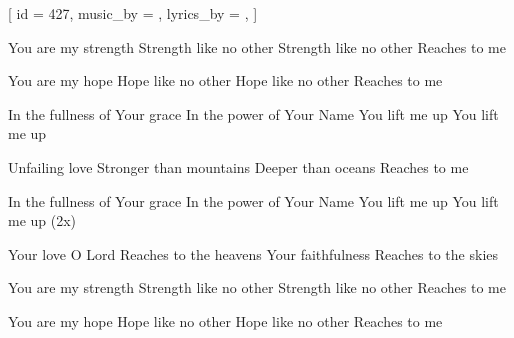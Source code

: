
[
    id                  = {427},
    music_by            = {},
    lyrics_by           = {},
]


\beginverse

You are my strength
Strength like no other
Strength like no other
Reaches to me

\endverse


\beginverse

You are my hope
Hope like no other
Hope like no other
Reaches to me

\endverse


\beginverse

In the fullness of Your grace
In the power of Your Name
You lift me up
You lift me up

\endverse



\beginverse

Unfailing love
Stronger than mountains
Deeper than oceans
Reaches to me

\endverse


\beginverse

In the fullness of Your grace
In the power of Your Name
You lift me up
You lift me up (2x)

\endverse



\beginverse

Your love O Lord
Reaches to the heavens
Your faithfulness
Reaches to the skies

\endverse


\beginverse

You are my strength
Strength like no other
Strength like no other
Reaches to me

\endverse


\beginverse

You are my hope
Hope like no other
Hope like no other
Reaches to me

\endverse


\endsong
